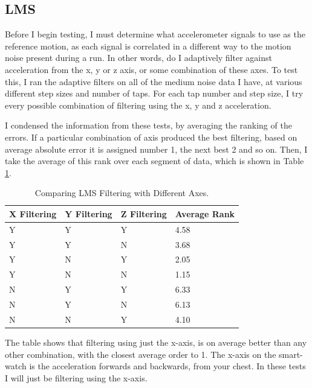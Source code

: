 \documentclass[12pt,a4paper,twoside,openany]{report}
\begin{document}
\subsection{LMS}

Before I begin testing, I must determine what accelerometer signals to use as
the reference motion, as each signal is correlated in a different way to the
motion noise present during a run. In
other words, do I adaptively filter against acceleration from the x, y or z
axis, or some combination of these axes. To test this, I ran the adaptive
filters on all of the medium noise data I have, at various different step sizes
and number of taps. For each tap number and step size, I try every possible
combination of filtering using the x, y and z acceleration. 

I condensed the information from these tests, by averaging the ranking of
the errors. If a particular combination of axis produced the best filtering,
based on average absolute error 
it is assigned number 1, the next best 2 and so on. Then, I take the average
of this rank over each segment of data, which is shown in Table \ref{table:lms-errors}.

\begin{table}[]
\centering
\caption{Comparing LMS Filtering with Different Axes.}
\label{table:lms-errors}
\begin{tabular}{|l|l|l|l|}
\hline
X Filtering & Y Filtering & Z Filtering & Average Rank \\ \hline
Y           & Y           & Y           & 4.58          \\
Y           & Y           & N           & 3.68          \\
Y           & N           & Y           & 2.05          \\
Y           & N           & N           & 1.15          \\
N           & Y           & Y           & 6.33          \\
N           & Y           & N           & 6.13          \\
N           & N           & Y           & 4.10          \\
\hline
\end{tabular}
\end{table}

The table shows that filtering using just the x-axis, is on average better
than any other combination, with the closest average order to 1. The x-axis on
the smart-watch is the acceleration forwards and backwards, from your chest.
In these tests I will just be filtering using the x-axis.
\end{document}
